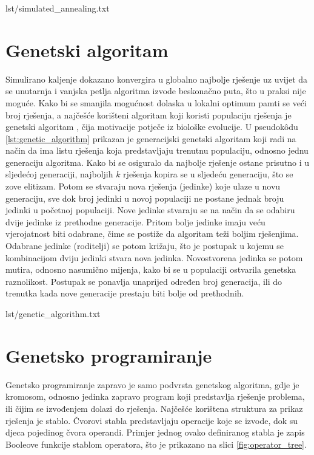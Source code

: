 \begin{minipage}{0.95\textwidth}
     {lst/simulated_annealing.txt}
\end{minipage}


\section{Genetski algoritam}
Simulirano kaljenje dokazano konvergira u globalno najbolje rješenje uz uvijet da se unutarnja i vanjska petlja algoritma izvode beskonačno puta, što u praksi nije moguće.
Kako bi se smanjila mogućnost dolaska u lokalni optimum pamti se veći broj rješenja, a najčešće korišteni algoritam koji koristi populaciju rješenja je genetski algoritam \cite{PrirodomInspirirani}, čija motivacije potječe iz biološke evolucije.
U pseudok\^{o}du \ref{lst:genetic_algorithm} prikazan je generacijski genetski algoritam koji radi na način da ima listu rješenja koja predstavljaju trenutnu populaciju, odnosno jednu generaciju algoritma.
Kako bi se osiguralo da najbolje rješenje ostane prisutno i u sljedećoj generaciji, najboljih $k$ rješenja kopira se u sljedeću generaciju, što se zove elitizam. 
Potom se stvaraju nova rješenja (jedinke) koje ulaze u novu generaciju, sve dok broj jedinki u novoj populaciji ne postane jednak broju jedinki u početnoj populaciji. 
Nove jedinke stvaraju se na način da se odabiru dvije jedinke iz prethodne generacije.
Pritom bolje jedinke imaju veću vjerojatnost biti odabrane, čime se postiže da algoritam teži boljim rješenjima.
Odabrane jedinke (roditelji) se potom križaju, što je postupak u kojemu se kombinacijom dviju jedinki stvara nova jedinka.
Novostvorena jedinka se potom mutira, odnosno nasumično mijenja, kako bi se u populaciji ostvarila genetska raznolikost.
Postupak se ponavlja unaprijed određen broj generacija, ili do trenutka kada nove generacije prestaju biti bolje od prethodnih.

\begin{minipage}{0.95\textwidth}
     {lst/genetic_algorithm.txt}
\end{minipage}


\section{Genetsko programiranje}
Genetsko programiranje \cite{koza1992genetic} zapravo je samo podvrsta genetskog algoritma, gdje je kromosom, odnosno jedinka zapravo program koji predstavlja rješenje problema, ili čijim se izvođenjem dolazi do rješenja.
Najčešće korištena struktura za prikaz rješenja je stablo. 
Čvorovi stabla predstavljaju operacije koje se izvode, dok su djeca pojedinog čvora operandi.
Primjer jednog ovako definiranog stabla je zapis Booleove funkcije stablom operatora, što je prikazano na slici \ref{fig:operator_tree}.

